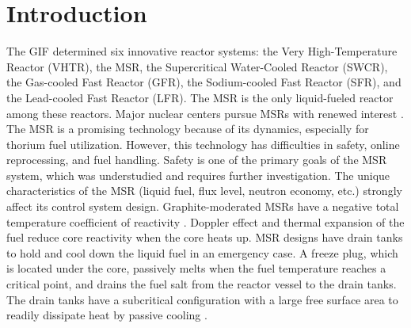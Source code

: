 \section{Introduction} \label{Introduction}

The \gls{GIF} \cite{doe2002technology} determined six innovative reactor 
systems: the Very High-Temperature Reactor (VHTR), the \gls{MSR}, the 
Supercritical Water-Cooled Reactor (SWCR), the Gas-cooled Fast Reactor (GFR), 
the Sodium-cooled Fast Reactor (SFR), and the Lead-cooled Fast Reactor (LFR). 
The MSR is the only liquid-fueled reactor among these reactors. Major nuclear 
centers pursue MSRs with renewed interest \cite{betzler_impacts_2019, 
ashraf2020whole,betzler2016modeling,mohsin2019safety,zhang2020radiotoxicity}.
The MSR is a promising technology because of its dynamics, especially for 
thorium fuel utilization. However, this technology has difficulties in safety, 
online reprocessing, and fuel handling. Safety is one of the primary goals of 
the MSR system, which was understudied and requires further investigation. The 
unique characteristics of the MSR (liquid fuel, flux level, neutron economy, 
etc.) strongly affect its control system design. Graphite-moderated MSRs have 
a negative total temperature coefficient of reactivity 
\cite{ashraf2020whole,robertson_conceptual_1971,nuttin2005potential,rykhlevskii2019modeling,li_optimization_2018}.
Doppler effect and thermal expansion of the fuel reduce core reactivity when 
the core heats up. MSR designs have drain tanks to 
hold and cool down the liquid fuel in an emergency case. A freeze plug, which 
is located under the core, passively melts when the fuel temperature reaches a 
critical point, and drains the fuel salt from the reactor vessel to the drain 
tanks. The drain tanks have a subcritical
configuration with a large free 
surface area to readily dissipate heat by passive cooling 
\cite{elsheikh2013safety}.

